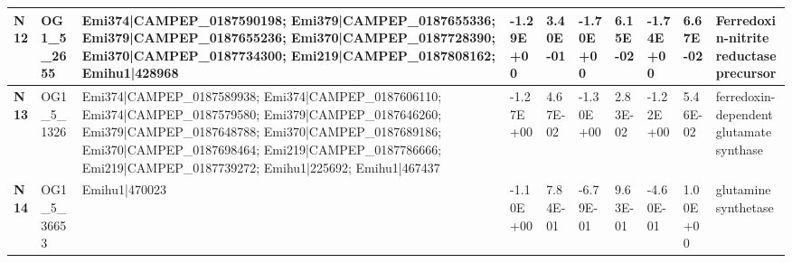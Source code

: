 \begin{landscape}
\begin{center}
\begin{footnotesize}
\begin{longtable}{|p{0.5cm}|p{1.5cm}|p{4cm}|l|l|l|l|l|l|l|}
\textbf{N12} & OG1\_5\_2655  & Emi374|CAMPEP\_0187590198; Emi379|CAMPEP\_0187655336; Emi379|CAMPEP\_0187655236; Emi370|CAMPEP\_0187728390; Emi370|CAMPEP\_0187734300; Emi219|CAMPEP\_0187808162; Emihu1|428968                                                                                                                                                                                                                                                                                                                                                                                                                                                          & -1.29E+00 & 3.40E-01 & -1.70E+00 & 6.15E-02 & -1.74E+00 & 6.67E-02 & Ferredoxin-nitrite reductase precursor                                       \\ \hline
\textbf{N13} & OG1\_5\_1326  & Emi374|CAMPEP\_0187589938; Emi374|CAMPEP\_0187606110; Emi374|CAMPEP\_0187579580; Emi379|CAMPEP\_0187646260; Emi379|CAMPEP\_0187648788; Emi370|CAMPEP\_0187689186; Emi370|CAMPEP\_0187698464; Emi219|CAMPEP\_0187786666; Emi219|CAMPEP\_0187739272; Emihu1|225692; Emihu1|467437                                                                                                                                                                                                                                                                                                                                                          & -1.27E+00 & 4.67E-02 & -1.30E+00 & 2.83E-02 & -1.22E+00 & 5.46E-02 & ferredoxin-dependent glutamate synthase                                      \\ \hline
\textbf{N14} & OG1\_5\_36653 & Emihu1|470023                                                                                                                                                                                                                                                                                                                                                                                                                                                                                                                                                                                                                            & -1.10E+00 & 7.84E-01 & -6.79E-01 & 9.63E-01 & -4.60E-01 & 1.00E+00 & glutamine synthetase                                                         \\ \hline

\end{longtable}
\end{footnotesize}
\end{center}
\end{landscape}
